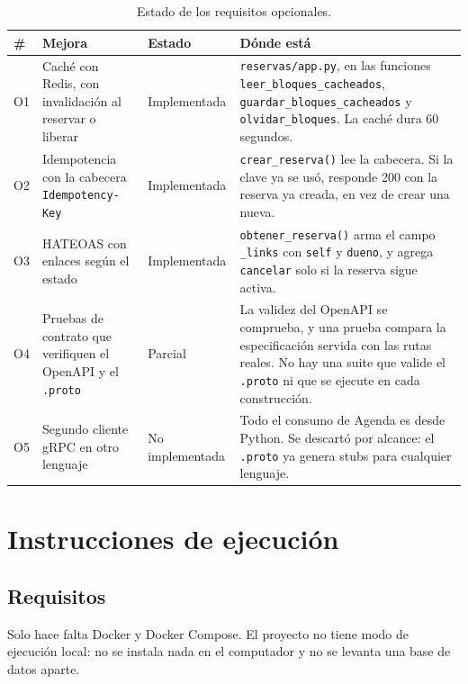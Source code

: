 \documentclass[12pt, a4paper]{article}
\begin{document}
\begin{table}[H]
\centering
\caption{Estado de los requisitos opcionales.}
\label{tab:opcionales}
\begin{tabular}{@{}p{0.9cm}p{4.0cm}p{2.3cm}p{5.4cm}@{}}
\toprule
\textbf{\#} & \textbf{Mejora} & \textbf{Estado} & \textbf{Dónde está} \\
\midrule
O1 & Caché con Redis, con invalidación al reservar o liberar &
Implementada &
\texttt{reservas/app.py}, en las funciones \texttt{leer\_bloques\_cacheados},
\texttt{guardar\_bloques\_cacheados} y \texttt{olvidar\_bloques}. La caché
dura 60 segundos. \\
\addlinespace
O2 & Idempotencia con la cabecera \texttt{Idempotency-Key} &
Implementada &
\texttt{crear\_reserva()} lee la cabecera. Si la clave ya se usó, responde
200 con la reserva ya creada, en vez de crear una nueva. \\
\addlinespace
O3 & HATEOAS con enlaces según el estado &
Implementada &
\texttt{obtener\_reserva()} arma el campo \texttt{\_links} con
\texttt{self} y \texttt{dueno}, y agrega \texttt{cancelar} solo si la
reserva sigue activa. \\
\addlinespace
O4 & Pruebas de contrato que verifiquen el OpenAPI y el \texttt{.proto} &
Parcial &
La validez del OpenAPI se comprueba, y una prueba compara la
especificación servida con las rutas reales. No hay una suite que valide
el \texttt{.proto} ni que se ejecute en cada construcción. \\
\addlinespace
O5 & Segundo cliente gRPC en otro lenguaje &
No implementada &
Todo el consumo de Agenda es desde Python. Se descartó por alcance: el
\texttt{.proto} ya genera stubs para cualquier lenguaje. \\
\bottomrule
\end{tabular}
\end{table}


\newpage
\section{Instrucciones de ejecución}

\subsection{Requisitos}

Solo hace falta Docker y Docker Compose. El proyecto no tiene modo de
ejecución local: no se instala nada en el computador y no se levanta una
base de datos aparte.
\end{document}
